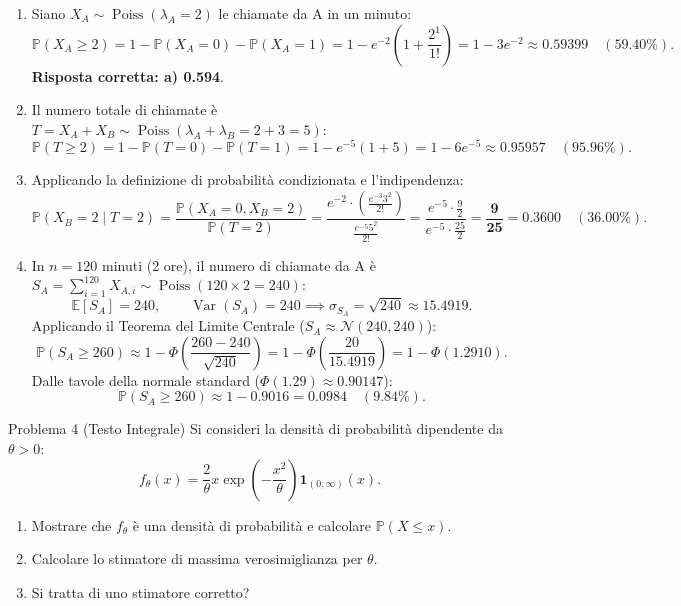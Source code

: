 \documentclass[11pt,a4paper]{article}
\newcommand{\EE}{\mathbb{E}}
\newcommand{\Prob}{\mathbb{P}}
\newcommand{\Var}{\operatorname{Var}}
\begin{document}
\begin{soluzionebox}
\begin{enumerate}[label=(\alph*)]
    \item Siano $X_A \sim \operatorname{Poiss}(\lambda_A = 2)$ le chiamate da A in un minuto:
    \[
    \Prob(X_A \ge 2) = 1 - \Prob(X_A = 0) - \Prob(X_A = 1) = 1 - e^{-2}\left(1 + \frac{2^1}{1!}\right) = 1 - 3e^{-2} \approx \mathbf{0.59399} \quad (\mathbf{59.40\%}).
    \]
    \textbf{Risposta corretta: a) 0.594}.

    \item Il numero totale di chiamate è $T = X_A + X_B \sim \operatorname{Poiss}(\lambda_A + \lambda_B = 2 + 3 = 5)$:
    \[
    \Prob(T \ge 2) = 1 - \Prob(T = 0) - \Prob(T = 1) = 1 - e^{-5}\left(1 + 5\right) = 1 - 6e^{-5} \approx \mathbf{0.95957} \quad (\mathbf{95.96\%}).
    \]

    \item Applicando la definizione di probabilità condizionata e l'indipendenza:
    \[
    \Prob(X_B = 2 \mid T = 2) = \frac{\Prob(X_A = 0, X_B = 2)}{\Prob(T = 2)} = \frac{e^{-2} \cdot \left( \frac{e^{-3} 3^2}{2!} \right)}{\frac{e^{-5} 5^2}{2!}} = \frac{e^{-5} \cdot \frac{9}{2}}{e^{-5} \cdot \frac{25}{2}} = \mathbf{\frac{9}{25} = 0.3600} \quad (\mathbf{36.00\%}).
    \]

    \item In $n = 120$ minuti (2 ore), il numero di chiamate da A è $S_A = \sum_{i=1}^{120} X_{A,i} \sim \operatorname{Poiss}(120 \times 2 = 240)$:
    \[
    \EE[S_A] = 240, \qquad \Var(S_A) = 240 \implies \sigma_{S_A} = \sqrt{240} \approx 15.4919.
    \]
    Applicando il Teorema del Limite Centrale ($S_A \approx \mathcal{N}(240, 240)$):
    \[
    \Prob(S_A \ge 260) \approx 1 - \Phi\left( \frac{260 - 240}{\sqrt{240}} \right) = 1 - \Phi\left( \frac{20}{15.4919} \right) = 1 - \Phi(1.2910).
    \]
    Dalle tavole della normale standard ($\Phi(1.29) \approx 0.90147$):
    \[
    \Prob(S_A \ge 260) \approx 1 - 0.9016 = \mathbf{0.0984} \quad (\mathbf{9.84\%}).
    \]
\end{enumerate}
\end{soluzionebox}

\begin{problemabox}{Problema 4 (Testo Integrale)}
Si consideri la densità di probabilità dipendente da $\theta > 0$:
\[
f_\theta(x) = \frac{2}{\theta} x \exp\left(-\frac{x^2}{\theta}\right) \mathbf{1}_{(0,\infty)}(x).
\]
\begin{enumerate}[label=(\alph*)]
    \item Mostrare che $f_\theta$ è una densità di probabilità e calcolare $\Prob(X \le x)$.
    \item Calcolare lo stimatore di massima verosimiglianza per $\theta$.
    \item Si tratta di uno stimatore corretto?
\end{enumerate}
\end{problemabox}
\end{document}
